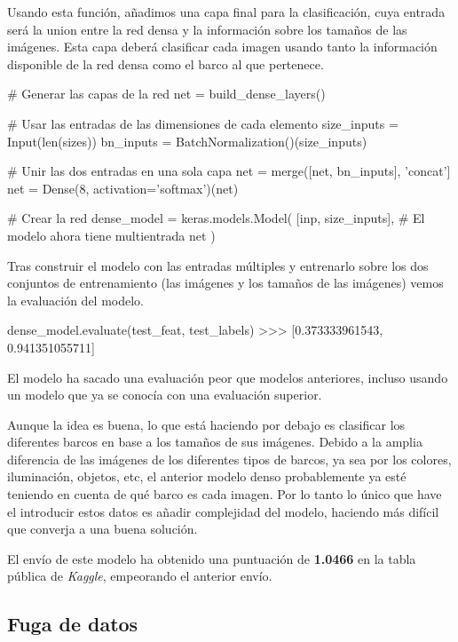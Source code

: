Usando esta función, añadimos una capa final para la clasificación, cuya entrada
será la union entre la red densa y la información sobre los tamaños de las
imágenes. Esta capa deberá clasificar cada imagen usando tanto la información
disponible de la red densa como el barco al que pertenece.

\begin{python}
# Generar las capas de la red
net = build_dense_layers()

# Usar las entradas de las dimensiones de cada elemento
size_inputs = Input(len(sizes))
bn_inputs = BatchNormalization()(size_inputs)

# Unir las dos entradas en una sola capa
net = merge([net, bn_inputs], 'concat']
net = Dense(8, activation='softmax')(net)

# Crear la red
dense_model = keras.models.Model(
    [inp, size_inputs],  # El modelo ahora tiene multientrada
    net
)
\end{python}

Tras construir el modelo con las entradas múltiples y entrenarlo sobre los dos
conjuntos de entrenamiento (las imágenes y los tamaños de las imágenes) vemos
la evaluación del modelo.

\begin{python}
dense_model.evaluate(test_feat, test_labels)
>>> [0.373333961543, 0.941351055711]
\end{python}

El modelo ha sacado una evaluación peor que modelos anteriores, incluso usando
un modelo que ya se conocía con una evaluación superior.

Aunque la idea es buena, lo que está haciendo por debajo es clasificar los
diferentes barcos en base a los tamaños de sus imágenes. Debido a la amplia
diferencia de las imágenes de los diferentes tipos de barcos, ya sea por los
colores, iluminación, objetos, etc, el anterior modelo denso probablemente ya
esté teniendo en cuenta de qué barco es cada imagen. Por lo tanto lo único que
have el introducir estos datos es añadir complejidad del modelo, haciendo más
difícil que converja a una buena solución.

El envío de este modelo ha obtenido una puntuación de \textbf{1.0466} en la
tabla pública de \textit{Kaggle}, empeorando el anterior envío.

\subsection{Fuga de datos}

